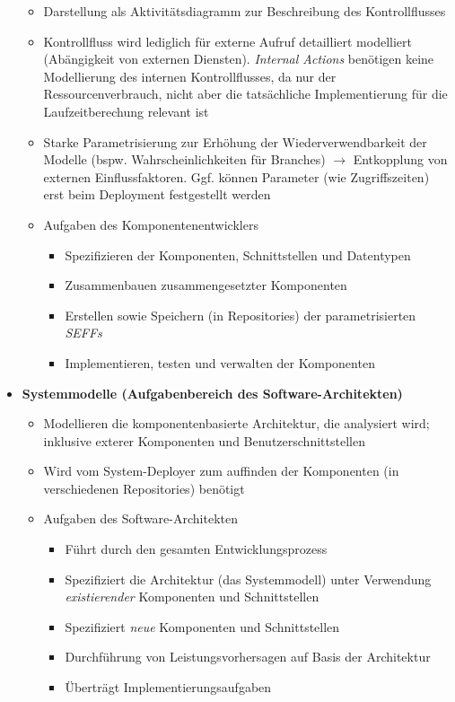\begin{itemize}
\begin{itemize}
		\item Darstellung als Aktivitätsdiagramm zur Beschreibung des Kontrollflusses
		\item Kontrollfluss wird lediglich für externe Aufruf detailliert modelliert (Abängigkeit von externen Diensten). \textit{Internal Actions} benötigen keine Modellierung des internen Kontrollflusses, da nur der Ressourcenverbrauch, nicht aber die tatsächliche Implementierung für die Laufzeitberechung relevant ist
		\item Starke Parametrisierung zur Erhöhung der Wiederverwendbarkeit der Modelle (bspw. Wahrscheinlichkeiten für Branches) \(\rightarrow\) Entkopplung von externen Einflussfaktoren. Ggf. können Parameter (wie Zugriffszeiten) erst beim Deployment festgestellt werden
		\item Aufgaben des Komponentenentwicklers
		\begin{itemize}
			\item Spezifizieren der Komponenten, Schnittstellen und Datentypen
			\item Zusammenbauen zusammengesetzter Komponenten
			\item Erstellen sowie Speichern (in Repositories) der parametrisierten \textit{SEFFs}
			\item Implementieren, testen und verwalten der Komponenten
		\end{itemize}
	\end{itemize}
	\item \textbf{Systemmodelle (Aufgabenbereich des Software-Architekten)}
	\begin{itemize}
		\item Modellieren die komponentenbasierte Architektur, die analysiert wird; inklusive exterer Komponenten und Benutzerschnittstellen
		\item Wird vom System-Deployer zum auffinden der Komponenten (in verschiedenen Repositories) benötigt
		\item Aufgaben des Software-Architekten
		\begin{itemize}
			\item Führt durch den gesamten Entwicklungsprozess
			\item Spezifiziert die Architektur (das Systemmodell) unter Verwendung \textit{existierender} Komponenten und Schnittstellen
			\item Spezifiziert \textit{neue} Komponenten und Schnittstellen
			\item Durchführung von Leistungsvorhersagen auf Basis der Architektur
			\item Überträgt Implementierungsaufgaben

\end{itemize}
\end{itemize}
\end{itemize}
